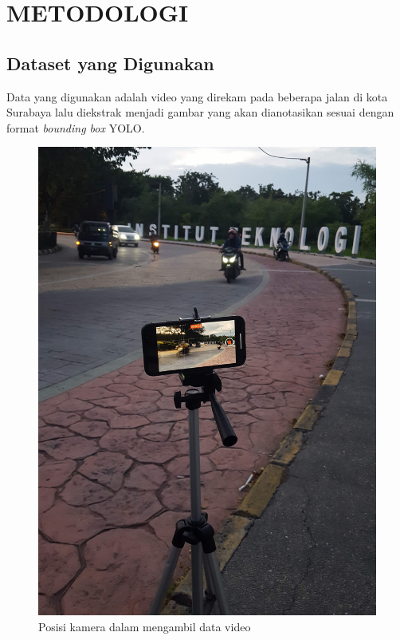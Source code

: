 \section{METODOLOGI}


\subsection{Dataset yang Digunakan}

Data yang digunakan adalah video yang direkam pada beberapa jalan di kota Surabaya lalu
diekstrak menjadi gambar yang akan dianotasikan sesuai dengan format \emph{bounding box}
YOLO.

\begin{figure} [ht] \centering
  \includegraphics[scale=0.05]{gambar/pengambilan-vide.jpg}
  \caption{Posisi kamera dalam mengambil data video}
  \label{fig:pengambilan-video}
\end{figure}

